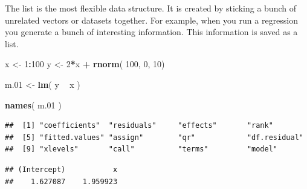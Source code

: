 \documentclass[]{book}
\newenvironment{Shaded}{\begin{snugshade}}{\end{snugshade}}
\newcommand{\DecValTok}[1]{\textcolor[rgb]{0.00,0.00,0.81}{#1}}
\newcommand{\FloatTok}[1]{\textcolor[rgb]{0.00,0.00,0.81}{#1}}
\newcommand{\KeywordTok}[1]{\textcolor[rgb]{0.13,0.29,0.53}{\textbf{#1}}}
\newcommand{\NormalTok}[1]{#1}
\newcommand{\OperatorTok}[1]{\textcolor[rgb]{0.81,0.36,0.00}{\textbf{#1}}}
\newcommand{\StringTok}[1]{\textcolor[rgb]{0.31,0.60,0.02}{#1}}
\theoremstyle{definition}
\theoremstyle{definition}
\theoremstyle{definition}
\theoremstyle{remark}
\begin{document}
The list is the most flexible data structure. It is created by sticking
a bunch of unrelated vectors or datasets together. For example, when you
run a regression you generate a bunch of interesting information. This
information is saved as a list.

\begin{Shaded}
\begin{Highlighting}[]
\NormalTok{x <-}\StringTok{ }\DecValTok{1}\OperatorTok{:}\DecValTok{100}
\NormalTok{y <-}\StringTok{ }\DecValTok{2}\OperatorTok{*}\NormalTok{x }\OperatorTok{+}\StringTok{ }\KeywordTok{rnorm}\NormalTok{( }\DecValTok{100}\NormalTok{, }\DecValTok{0}\NormalTok{, }\DecValTok{10}\NormalTok{)}

\NormalTok{m}\FloatTok{.01}\NormalTok{ <-}\StringTok{ }\KeywordTok{lm}\NormalTok{( y }\OperatorTok{~}\StringTok{ }\NormalTok{x )}

\KeywordTok{names}\NormalTok{( m}\FloatTok{.01}\NormalTok{ )}
\end{Highlighting}
\end{Shaded}

\begin{verbatim}
##  [1] "coefficients"  "residuals"     "effects"       "rank"         
##  [5] "fitted.values" "assign"        "qr"            "df.residual"  
##  [9] "xlevels"       "call"          "terms"         "model"
\end{verbatim}

\begin{Shaded}
\end{Shaded}

\begin{verbatim}
## (Intercept)           x 
##    1.627087    1.959923
\end{verbatim}

\begin{Shaded}
\end{Shaded}
\end{document}
